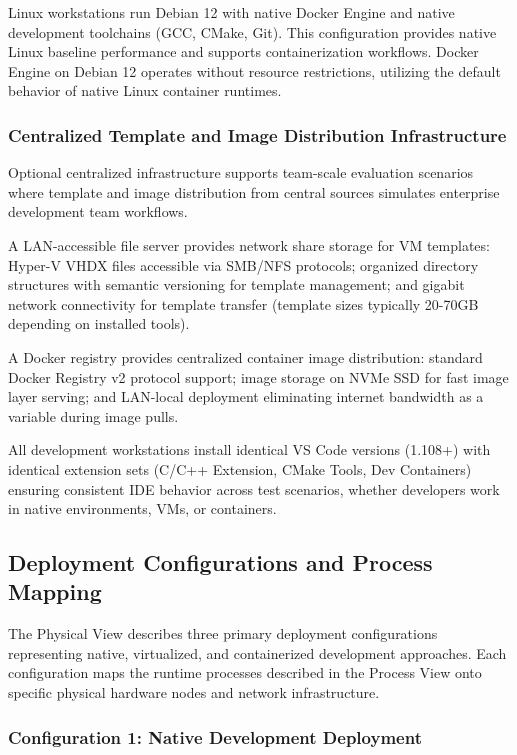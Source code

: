 Linux workstations run Debian 12 with native Docker Engine and native development toolchains (GCC, CMake, Git).
This configuration provides native Linux baseline performance and supports containerization workflows.
Docker Engine on Debian 12 operates without resource restrictions, utilizing the default behavior of native Linux container runtimes.

\subsubsection{Centralized Template and Image Distribution Infrastructure}

Optional centralized infrastructure supports team-scale evaluation scenarios where template and image distribution from central sources simulates enterprise development team workflows.

A LAN-accessible file server provides network share storage for VM templates: Hyper-V VHDX files accessible via SMB/NFS protocols; organized directory structures with semantic versioning for template management; and gigabit network connectivity for template transfer (template sizes typically 20-70GB depending on installed tools).

A Docker registry provides centralized container image distribution: standard Docker Registry v2 protocol support; image storage on NVMe SSD for fast image layer serving; and LAN-local deployment eliminating internet bandwidth as a variable during image pulls.

All development workstations install identical VS Code versions (1.108+) with identical extension sets (C/C++ Extension, CMake Tools, Dev Containers) ensuring consistent IDE behavior across test scenarios, whether developers work in native environments, VMs, or containers.

\subsection{Deployment Configurations and Process Mapping}

The Physical View describes three primary deployment configurations representing native, virtualized, and containerized development approaches.
Each configuration maps the runtime processes described in the Process View onto specific physical hardware nodes and network infrastructure.

\subsubsection{Configuration 1: Native Development Deployment}

